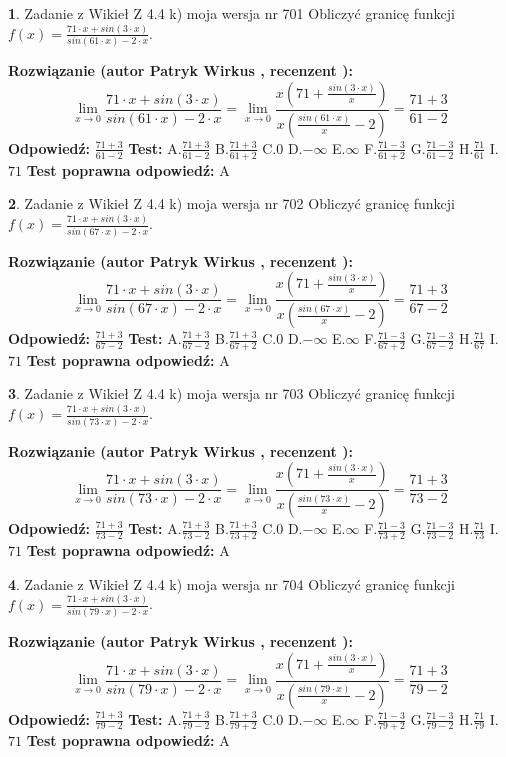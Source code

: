 \documentclass[12pt, a4paper]{article}
\theoremstyle{definition} %
\newtheorem{zad}{}
\newcommand{\zadStart}[1]{\begin{zad}#1\newline}
\newcommand{\zadStop}{\end{zad}}
\newcommand{\rozwStart}[2]{\noindent \textbf{Rozwiązanie (autor #1 , recenzent #2): }\newline}
\newcommand{\rozwStop}{\newline}
\newcommand{\odpStart}{\noindent \textbf{Odpowiedź:}\newline}
\newcommand{\odpStop}{\newline}
\newcommand{\testStart}{\noindent \textbf{Test:}\newline}
\newcommand{\testStop}{\newline}
\newcommand{\kluczStart}{\noindent \textbf{Test poprawna odpowiedź:}\newline}
\newcommand{\kluczStop}{\newline}
\begin{document}
\zadStart{Zadanie z Wikieł Z 4.4 k) moja wersja nr 701}
Obliczyć granicę funkcji $f(x)=\frac{71\cdot x +sin(3\cdot x)}{sin(61\cdot x) -2\cdot x}$.
\zadStop
\rozwStart{Patryk Wirkus}{}
$$\lim\limits_{x\to 0}\frac{71\cdot x +sin(3\cdot x)}{sin(61\cdot x) -2\cdot x}
=\lim\limits_{x\to 0}\frac{x(71+\frac{sin(3\cdot x)}{x})}{x(\frac{sin(61\cdot x)}{x}-2)}
=\frac{71+3}{61-2}$$
\rozwStop
\odpStart
$\frac{71+3}{61-2}$
\odpStop
\testStart
A.$\frac{71+3}{61-2}$
B.$\frac{71+3}{61+2}$
C.$0$
D.$-\infty$
E.$\infty$
F.$\frac{71-3}{61+2}$
G.$\frac{71-3}{61-2}$
H.$\frac{71}{61}$
I.$71$
\testStop
\kluczStart
A
\kluczStop



\zadStart{Zadanie z Wikieł Z 4.4 k) moja wersja nr 702}
Obliczyć granicę funkcji $f(x)=\frac{71\cdot x +sin(3\cdot x)}{sin(67\cdot x) -2\cdot x}$.
\zadStop
\rozwStart{Patryk Wirkus}{}
$$\lim\limits_{x\to 0}\frac{71\cdot x +sin(3\cdot x)}{sin(67\cdot x) -2\cdot x}
=\lim\limits_{x\to 0}\frac{x(71+\frac{sin(3\cdot x)}{x})}{x(\frac{sin(67\cdot x)}{x}-2)}
=\frac{71+3}{67-2}$$
\rozwStop
\odpStart
$\frac{71+3}{67-2}$
\odpStop
\testStart
A.$\frac{71+3}{67-2}$
B.$\frac{71+3}{67+2}$
C.$0$
D.$-\infty$
E.$\infty$
F.$\frac{71-3}{67+2}$
G.$\frac{71-3}{67-2}$
H.$\frac{71}{67}$
I.$71$
\testStop
\kluczStart
A
\kluczStop



\zadStart{Zadanie z Wikieł Z 4.4 k) moja wersja nr 703}
Obliczyć granicę funkcji $f(x)=\frac{71\cdot x +sin(3\cdot x)}{sin(73\cdot x) -2\cdot x}$.
\zadStop
\rozwStart{Patryk Wirkus}{}
$$\lim\limits_{x\to 0}\frac{71\cdot x +sin(3\cdot x)}{sin(73\cdot x) -2\cdot x}
=\lim\limits_{x\to 0}\frac{x(71+\frac{sin(3\cdot x)}{x})}{x(\frac{sin(73\cdot x)}{x}-2)}
=\frac{71+3}{73-2}$$
\rozwStop
\odpStart
$\frac{71+3}{73-2}$
\odpStop
\testStart
A.$\frac{71+3}{73-2}$
B.$\frac{71+3}{73+2}$
C.$0$
D.$-\infty$
E.$\infty$
F.$\frac{71-3}{73+2}$
G.$\frac{71-3}{73-2}$
H.$\frac{71}{73}$
I.$71$
\testStop
\kluczStart
A
\kluczStop



\zadStart{Zadanie z Wikieł Z 4.4 k) moja wersja nr 704}
Obliczyć granicę funkcji $f(x)=\frac{71\cdot x +sin(3\cdot x)}{sin(79\cdot x) -2\cdot x}$.
\zadStop
\rozwStart{Patryk Wirkus}{}
$$\lim\limits_{x\to 0}\frac{71\cdot x +sin(3\cdot x)}{sin(79\cdot x) -2\cdot x}
=\lim\limits_{x\to 0}\frac{x(71+\frac{sin(3\cdot x)}{x})}{x(\frac{sin(79\cdot x)}{x}-2)}
=\frac{71+3}{79-2}$$
\rozwStop
\odpStart
$\frac{71+3}{79-2}$
\odpStop
\testStart
A.$\frac{71+3}{79-2}$
B.$\frac{71+3}{79+2}$
C.$0$
D.$-\infty$
E.$\infty$
F.$\frac{71-3}{79+2}$
G.$\frac{71-3}{79-2}$
H.$\frac{71}{79}$
I.$71$
\testStop
\kluczStart
A
\kluczStop
\end{document}
